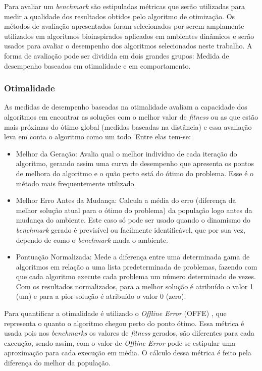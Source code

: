 Para avaliar um \textit{benchmark} são estipuladas métricas que serão utilizadas para medir a qualidade dos resultados obtidos pelo algoritmo de otimização. Os métodos de avaliação apresentados foram selecionados por serem amplamente utilizados em algoritmos bioinspirados aplicados em ambientes dinâmicos e serão usados para avaliar o desempenho dos algoritmos selecionados neste trabalho.
A forma de avaliação pode ser dividida em dois grandes grupos: Medida de desempenho baseados em otimalidade e em comportamento.

\subsubsection{Otimalidade}
As medidas de desempenho baseadas na otimalidade avaliam a capacidade dos algoritmos em encontrar as soluções com o melhor valor de \textit{fitness} ou as que estão mais próximas do ótimo global (medidas baseadas na distância) e essa avaliação leva em conta o algoritmo como um todo. Entre elas tem-se:

\begin{itemize}
	\item Melhor da Geração: Avalia qual o melhor indivíduo de cada iteração do algoritmo, gerando assim uma curva de desempenho que apresenta os pontos de melhora do algoritmo e o quão perto está do ótimo do problema. Esse é o método mais frequentemente utilizado.
	
	\item Melhor Erro Antes da Mudança: Calcula a média do erro (diferença da melhor solução atual para o ótimo do problema) da população logo antes da mudança do ambiente. Este caso só pode ser usado quando o dinamismo do \textit{benchmark} gerado é previsível ou facilmente identificável, que por sua vez, dependo de como o \textit{benchmark} muda o ambiente.
	
	\item Pontuação Normalizada: Mede a diferença entre uma determinada gama de algoritmos em relação a uma lista predeterminada de problemas, fazendo com que cada algoritmo execute cada problema um número determinado de vezes. Com os resultados normalizados, para a melhor solução é atribuído o valor 1 (um) e para a pior solução é atribuído o valor 0 (zero).
\end{itemize}

Para quantificar a otimalidade é utilizado o \textit{Offline Error} (OFFE) \cite{offlineError}, que representa o quanto o algoritmo chegou perto do ponto ótimo. Essa métrica é usada pois nos \textit{benchmarks} os valores de \textit{fitness} gerados, são diferentes para cada execução, sendo assim, com o valor de \textit{Offline Error} pode-se estipular uma aproximação para cada execução em média. O cálculo dessa métrica é feito pela diferença do melhor da população.

